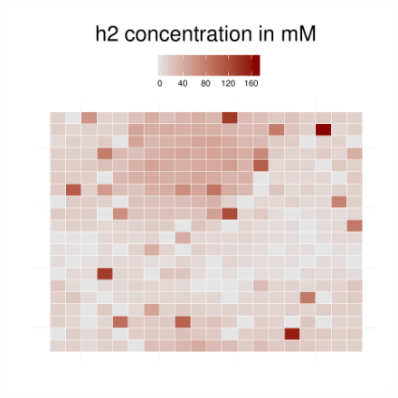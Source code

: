 \begin{figure}[h!]
{\begin{minipage}[t]{0.3\textwidth}
  \end{minipage}
  \begin{minipage}[t]{0.3\textwidth}
    \includegraphics[width=\textwidth]{../results/barkeri_beijerinckii_20x20_seed6764_h2150.pdf}
  \end{minipage}
  }
\end{figure}
